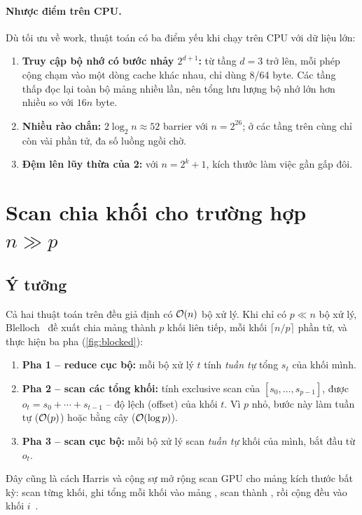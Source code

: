 \paragraph{Nhược điểm trên CPU.} Dù tối ưu về work, thuật toán có ba điểm yếu khi chạy trên
CPU với dữ liệu lớn:
\begin{enumerate}
  \item \textbf{Truy cập bộ nhớ có bước nhảy \(2^{d+1}\):} từ tầng \(d = 3\) trở lên, mỗi phép
        cộng chạm vào một dòng cache khác nhau, chỉ dùng 8/64 byte. Các tầng thấp đọc lại toàn
        bộ mảng nhiều lần, nên tổng lưu lượng bộ nhớ lớn hơn nhiều so với \(16n\) byte.
  \item \textbf{Nhiều rào chắn:} \(2\log_2 n \approx 52\) barrier với \(n = 2^{26}\); ở các tầng
        trên cùng chỉ còn vài phần tử, đa số luồng ngồi chờ.
  \item \textbf{Đệm lên lũy thừa của 2:} với \(n = 2^k + 1\), kích thước làm việc gần gấp đôi.
\end{enumerate}

\section{Scan chia khối cho trường hợp \texorpdfstring{\(n \gg p\)}{n >> p}}
\label{sec:alg-blocked}

\subsection{Ý tưởng}

Cả hai thuật toán trên đều giả định có \(\mathcal{O}(n)\) bộ xử lý. Khi chỉ có \(p \ll n\) bộ xử lý,
Blelloch~\cite[Mục 1.2]{blelloch1990} đề xuất chia mảng thành \(p\) khối liên tiếp, mỗi khối
\(\lceil n/p\rceil\) phần tử, và thực hiện ba pha (\cref{fig:blocked}):
\begin{enumerate}
  \item \textbf{Pha 1 -- reduce cục bộ:} mỗi bộ xử lý \(t\) tính \emph{tuần tự} tổng \(s_t\) của
        khối mình.
  \item \textbf{Pha 2 -- scan các tổng khối:} tính exclusive scan của \([s_0, \ldots, s_{p-1}]\),
        được \(o_t = s_0 + \cdots + s_{t-1}\) -- độ lệch (offset) của khối \(t\). Vì \(p\) nhỏ,
        bước này làm tuần tự (\(\mathcal{O}(p)\)) hoặc bằng cây (\(\mathcal{O}(\log p)\)).
  \item \textbf{Pha 3 -- scan cục bộ:} mỗi bộ xử lý scan \emph{tuần tự} khối của mình, bắt đầu từ
        \(o_t\).
\end{enumerate}
Đây cũng là cách Harris và cộng sự mở rộng scan GPU cho mảng kích thước bất kỳ: scan từng khối,
ghi tổng mỗi khối vào mảng , scan  thành , rồi cộng đều
 vào khối \(i\)~\cite[Mục 39.2.4]{harris2007}.

